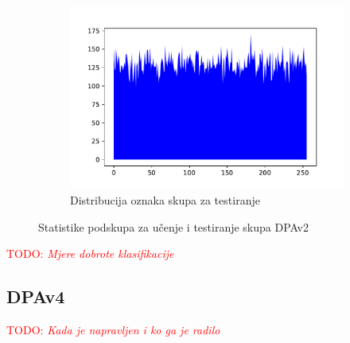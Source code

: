 \documentclass[times, utf8, numeric, diplomski]{fer}
\def\TODO#1{\noindent\textcolor{red}{TODO: \textit{#1}}\newline}
\def\todo#1{\TODO{#1}}
\begin{document}
\begin{figure}[H]
\begin{subfigure}{.5\textwidth}
\includegraphics[width=\textwidth]{nl256_ts_outputs.pdf}
\centering
\caption{Distribucija oznaka skupa za testiranje}
\label{fig:dpa2_test_outputs}
\end{subfigure}
\caption{Statistike podskupa za učenje i testiranje skupa DPAv2}
\end{figure}

\todo{Mjere dobrote klasifikacije}

\subsection{DPAv4}
\todo{Kada je napravljen i ko ga je radilo}
\end{document}
